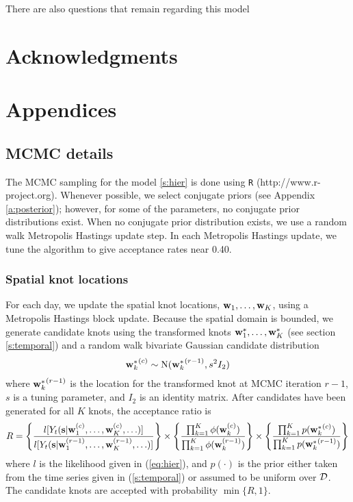 \documentclass[11pt]{article}
\begin{document}
There are also questions that remain regarding this model

\section*{Acknowledgments}

\appendix
\section{Appendices}
\subsection{MCMC details} \label{a:mcmc}
The MCMC sampling for the model \ref{s:hier} is done using {\tt R} (http://www.r-project.org). Whenever possible, we select conjugate priors (see Appendix \ref{a:posterior}); however, for some of the parameters, no conjugate prior distributions exist.
When no conjugate prior distribution exists, we use a random walk Metropolis Hastings update step.
In each Metropolis Hastings update, we tune the algorithm to give acceptance rates near 0.40.

\subsubsection*{Spatial knot locations}
For each day, we update the spatial knot locations, $\mbox{\bf w}_1, \ldots, \mbox{\bf w}_K$, using a Metropolis Hastings block update.
Because the spatial domain is bounded, we generate candidate knots using the transformed knots $\mbox{\bf w}^*_1, \ldots, \mbox{\bf w}^*_K$ (see section \ref{s:temporal}) and a random walk bivariate Gaussian candidate distribution
\begin{align*}
	{ \mbox{\bf w}^*_k}^{(c)} \sim \text{N}({\mbox{\bf w}^*_k}^{(r - 1)}, s^2 I_2)
\end{align*}
where ${\mbox{\bf w}^*_k}^{(r - 1)}$ is the location for the transformed knot at MCMC iteration $r - 1$, $s$ is a tuning parameter, and $I_2$ is an identity matrix.
After candidates have been generated for all $K$ knots, the acceptance ratio is
\begin{align*}
  R = \left\{ \frac{ l[ Y_t(\mbox{\bf s} | \mbox{\bf w}_1^{(c)}, \ldots, \mbox{\bf w}_K^{(c)}, \ldots)] }{l[ Y_t(\mbox{\bf s} | \mbox{\bf w}_1^{(r - 1)}, \ldots, \mbox{\bf w}_K^{(r - 1)}, \ldots)]} \right\} \times \left\{ \frac{ \prod_{k = 1}^{K}\phi(\mbox{\bf w}_k^{(c)})}{ \prod_{k = 1}^{K}\phi(\mbox{\bf w}_k^{(r - 1)})} \right\} \times \left\{ \frac{ \prod_{k = 1}^{K} p({\mbox{\bf w}^*_k}^{(c)})}{ \prod_{k = 1}^{K} p({\mbox{\bf w}^*_k}^{(r - 1)})}\right\}
\end{align*}
where $l$ is the likelihood given in (\ref{eq:hier}), and $p(\cdot)$ is the prior either taken from the time series given in (\ref{s:temporal}) or assumed to be uniform over ${\cal D}$.
The candidate knots are accepted with probability $\min\{R, 1\}$.
\end{document}
